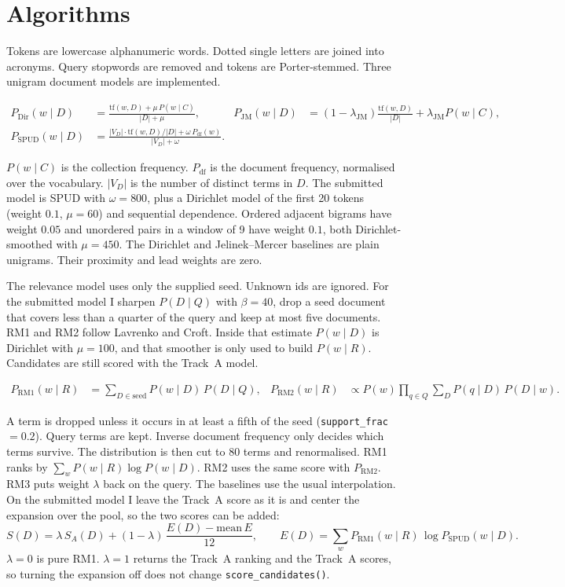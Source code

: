 \documentclass[10pt,a4paper]{article}
\begin{document}
\section{Algorithms}

Tokens are lowercase alphanumeric words. Dotted single letters are joined into acronyms. Query stopwords are removed and tokens are Porter-stemmed. Three unigram document models are implemented.

\begin{align*}
P_{\mathrm{Dir}}(w\mid D) &= \frac{\mathrm{tf}(w,D) + \mu\, P(w\mid C)}{|D| + \mu}, &
P_{\mathrm{JM}}(w\mid D) &= (1-\lambda_{\mathrm{JM}})\frac{\mathrm{tf}(w,D)}{|D|} + \lambda_{\mathrm{JM}} P(w\mid C), \\
P_{\mathrm{SPUD}}(w\mid D) &= \frac{|V_D|\cdot \mathrm{tf}(w,D)/|D| + \omega\, P_{\mathrm{df}}(w)}{|V_D| + \omega}.
\end{align*}

$P(w\mid C)$ is the collection frequency. $P_{\mathrm{df}}$ is the document frequency, normalised over the vocabulary. $|V_D|$ is the number of distinct terms in $D$. The submitted model is SPUD with $\omega = 800$, plus a Dirichlet model of the first 20 tokens (weight $0.1$, $\mu = 60$) and sequential dependence. Ordered adjacent bigrams have weight $0.05$ and unordered pairs in a window of 9 have weight $0.1$, both Dirichlet-smoothed with $\mu = 450$. The Dirichlet and Jelinek--Mercer baselines are plain unigrams. Their proximity and lead weights are zero.

The relevance model uses only the supplied seed. Unknown ids are ignored. For the submitted model I sharpen $P(D\mid Q)$ with $\beta = 40$, drop a seed document that covers less than a quarter of the query and keep at most five documents. RM1 and RM2 follow Lavrenko and Croft. Inside that estimate $P(w\mid D)$ is Dirichlet with $\mu = 100$, and that smoother is only used to build $P(w\mid R)$. Candidates are still scored with the Track~A model.

\begin{align*}
P_{\mathrm{RM1}}(w\mid R) &= \sum_{D \in \mathrm{seed}} P(w\mid D)\, P(D\mid Q), &
P_{\mathrm{RM2}}(w\mid R) &\propto P(w) \prod_{q \in Q} \sum_{D} P(q\mid D)\, P(D\mid w).
\end{align*}

A term is dropped unless it occurs in at least a fifth of the seed (\texttt{support\_frac}${=}0.2$). Query terms are kept. Inverse document frequency only decides which terms survive. The distribution is then cut to 80 terms and renormalised. RM1 ranks by $\sum_w P(w\mid R)\log P(w\mid D)$. RM2 uses the same score with $P_{\mathrm{RM2}}$. RM3 puts weight $\lambda$ back on the query. The baselines use the usual interpolation. On the submitted model I leave the Track~A score as it is and center the expansion over the pool, so the two scores can be added:
\[
S(D) = \lambda\, S_A(D) + (1-\lambda)\,\frac{E(D) - \mathrm{mean}\, E}{12},
\qquad
E(D) = \sum_w P_{\mathrm{RM1}}(w\mid R)\, \log P_{\mathrm{SPUD}}(w\mid D).
\]
$\lambda = 0$ is pure RM1. $\lambda = 1$ returns the Track~A ranking and the Track~A scores, so turning the expansion off does not change \texttt{score\_candidates()}.
\end{document}
